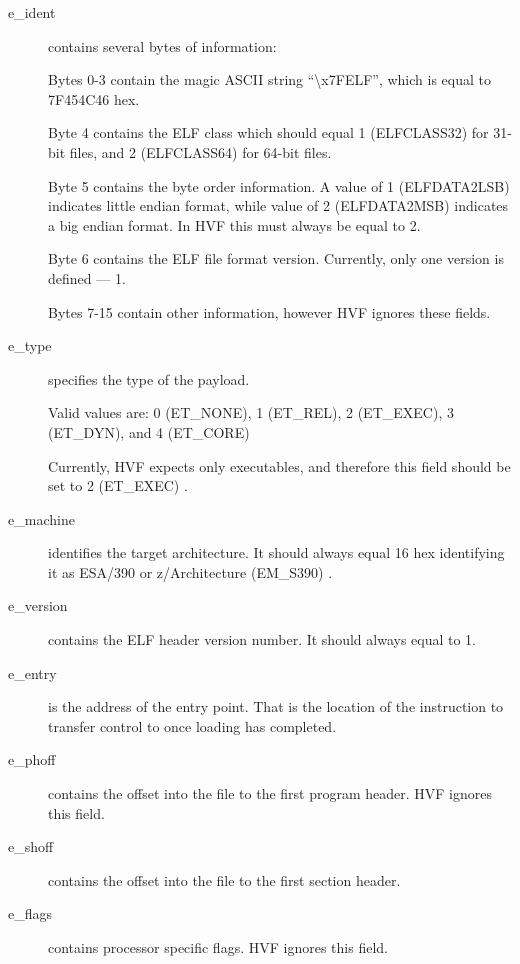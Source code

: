 \begin{description}
\item[e\_ident] contains several bytes of information:
	
	Bytes 0-3 contain the magic ASCII string ``\textbackslash x7FELF'', which is
	equal to 7F454C46 hex.

	Byte 4 contains the ELF class which should equal 1 \cbstart
	(ELFCLASS32) \cbend for 31-bit files, and 2 \cbstart (ELFCLASS64)
	\cbend for 64-bit files.

	Byte 5 contains the byte order information.  A value of 1 \cbstart
	(ELFDATA2LSB) \cbend indicates little endian format, while value of
	2 \cbstart (ELFDATA2MSB) \cbend indicates a big endian format.  In
	HVF this must always be equal to 2.

	Byte 6 contains the ELF file format version.  Currently, only one
	version is defined --- 1.

	Bytes 7-15 contain other information, however HVF ignores these
	fields.

\item[e\_type] specifies the type of the payload.

	\cbstart
	Valid values are: 0 (ET\_NONE), 1 (ET\_REL), 2 (ET\_EXEC), 3
	(ET\_DYN), and 4 (ET\_CORE)
	\cbend

	Currently, HVF expects only executables, and therefore this field
	should be set to 2 \cbstart (ET\_EXEC) \cbend.

\item[e\_machine] identifies the target architecture.  It should always
	equal 16 hex identifying it as ESA/390 or z/Architecture \cbstart
	(EM\_S390) \cbend.

\item[e\_version] contains the ELF header version number.  It should always
	equal to 1.

\item[e\_entry] is the address of the entry point.  That is the location of
	the instruction to transfer control to once loading has completed.

\item[e\_phoff] contains the offset into the file to the first program
	header.  HVF ignores this field.

\item[e\_shoff] contains the offset into the file to the first section
	header.

\item[e\_flags] contains processor specific flags.  HVF ignores this field.


\end{description}
